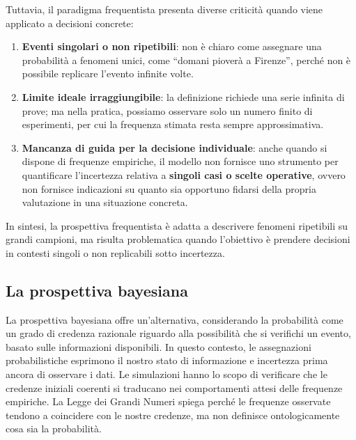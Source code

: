 \documentclass[
  letterpaper,
  DIV=11,
  numbers=noendperiod,
  oneside]{scrreprt}
\theoremstyle{definition}
\theoremstyle{plain}
\theoremstyle{definition}
\theoremstyle{remark}
\begin{document}
Tuttavia, il paradigma frequentista presenta diverse criticità quando
viene applicato a decisioni concrete:

\begin{enumerate}
\def\labelenumi{\arabic{enumi}.}
\item
  \textbf{Eventi singolari o non ripetibili}: non è chiaro come
  assegnare una probabilità a fenomeni unici, come ``domani pioverà a
  Firenze'', perché non è possibile replicare l'evento infinite volte.
\item
  \textbf{Limite ideale irraggiungibile}: la definizione richiede una
  serie infinita di prove; ma nella pratica, possiamo osservare solo un
  numero finito di esperimenti, per cui la frequenza stimata resta
  sempre approssimativa.
\item
  \textbf{Mancanza di guida per la decisione individuale}: anche quando
  si dispone di frequenze empiriche, il modello non fornisce uno
  strumento per quantificare l'incertezza relativa a \textbf{singoli
  casi o scelte operative}, ovvero non fornisce indicazioni su quanto
  sia opportuno fidarsi della propria valutazione in una situazione
  concreta.
\end{enumerate}

In sintesi, la prospettiva frequentista è adatta a descrivere fenomeni
ripetibili su grandi campioni, ma risulta problematica quando
l'obiettivo è prendere decisioni in contesti singoli o non replicabili
sotto incertezza.

\subsection{La prospettiva bayesiana}\label{la-prospettiva-bayesiana}

La prospettiva bayesiana offre un'alternativa, considerando la
probabilità come un grado di credenza razionale riguardo alla
possibilità che si verifichi un evento, basato sulle informazioni
disponibili. In questo contesto, le assegnazioni probabilistiche
esprimono il nostro stato di informazione e incertezza prima ancora di
osservare i dati. Le simulazioni hanno lo scopo di verificare che le
credenze iniziali coerenti si traducano nei comportamenti attesi delle
frequenze empiriche. La Legge dei Grandi Numeri spiega perché le
frequenze osservate tendono a coincidere con le nostre credenze, ma non
definisce ontologicamente cosa sia la probabilità.
\end{document}
